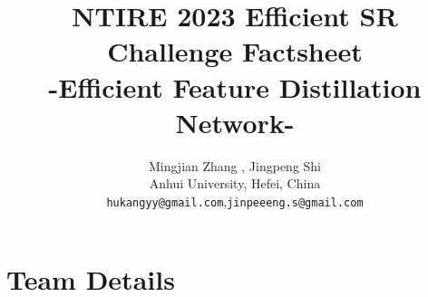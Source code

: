 \documentclass[10pt,twocolumn,letterpaper]{article}
\begin{document}
\title{NTIRE 2023 Efficient SR Challenge Factsheet\\-Efficient Feature Distillation Network-}
\author{Mingjian Zhang , Jingpeng Shi\\
Anhui University, Hefei, China\\
{\tt\small hukangyy@gmail.com},{\tt\small jinpeeeng.s@gmail.com}
}
\maketitle

\newcommand{\github}[1]{\href{https://github.com/#1/}{github.com/#1}}


\section{Team Details}
\end{document}
